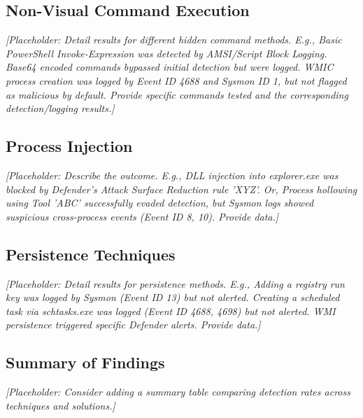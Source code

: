 \documentclass{ULBreport}
\begin{document}
\subsection{Non-Visual Command Execution}
\textit{[Placeholder: Detail results for different hidden command methods. E.g., Basic PowerShell Invoke-Expression was detected by AMSI/Script Block Logging. Base64 encoded commands bypassed initial detection but were logged. WMIC process creation was logged by Event ID 4688 and Sysmon ID 1, but not flagged as malicious by default. Provide specific commands tested and the corresponding detection/logging results.]}

\subsection{Process Injection}
\textit{[Placeholder: Describe the outcome. E.g., DLL injection into explorer.exe was blocked by Defender's Attack Surface Reduction rule 'XYZ'. Or, Process hollowing using Tool 'ABC' successfully evaded detection, but Sysmon logs showed suspicious cross-process events (Event ID 8, 10). Provide data.]}

\subsection{Persistence Techniques}
\textit{[Placeholder: Detail results for persistence methods. E.g., Adding a registry run key was logged by Sysmon (Event ID 13) but not alerted. Creating a scheduled task via schtasks.exe was logged (Event ID 4688, 4698) but not alerted. WMI persistence triggered specific Defender alerts. Provide data.]}

\subsection{Summary of Findings}
\textit{[Placeholder: Consider adding a summary table comparing detection rates across techniques and solutions.]}
\end{document}
